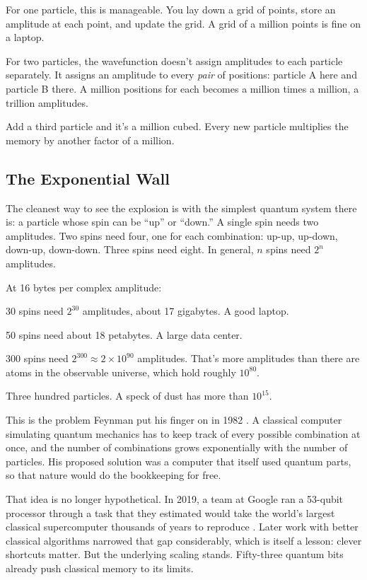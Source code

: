 For one particle, this is manageable. You lay down a grid of points, store an amplitude at each point, and update the grid. A grid of a million points is fine on a laptop.

For two particles, the wavefunction doesn't assign amplitudes to each particle separately. It assigns an amplitude to every \emph{pair} of positions: particle A here and particle B there. A million positions for each becomes a million times a million, a trillion amplitudes.

Add a third particle and it's a million cubed. Every new particle multiplies the memory by another factor of a million.

\subsection{The Exponential Wall}

The cleanest way to see the explosion is with the simplest quantum system there is: a particle whose spin can be ``up'' or ``down.'' A single spin needs two amplitudes. Two spins need four, one for each combination: up-up, up-down, down-up, down-down. Three spins need eight. In general, \(n\) spins need \(2^n\) amplitudes.

\begin{examplebox}
At 16 bytes per complex amplitude:
\begin{compactchecklist}
\item 30 spins need \(2^{30}\) amplitudes, about 17 gigabytes. A good laptop.
\item 50 spins need about 18 petabytes. A large data center.
\item 300 spins need \(2^{300} \approx 2 \times 10^{90}\) amplitudes. That's more amplitudes than there are atoms in the observable universe, which hold roughly \(10^{80}\).
\end{compactchecklist}
Three hundred particles. A speck of dust has more than \(10^{15}\).
\end{examplebox}

This is the problem Feynman put his finger on in 1982 \cite{feynman1982}. A classical computer simulating quantum mechanics has to keep track of every possible combination at once, and the number of combinations grows exponentially with the number of particles. His proposed solution was a computer that itself used quantum parts, so that nature would do the bookkeeping for free.

That idea is no longer hypothetical. In 2019, a team at Google ran a 53-qubit processor through a task that they estimated would take the world's largest classical supercomputer thousands of years to reproduce \cite{arute2019}. Later work with better classical algorithms narrowed that gap considerably, which is itself a lesson: clever shortcuts matter. But the underlying scaling stands. Fifty-three quantum bits already push classical memory to its limits.

